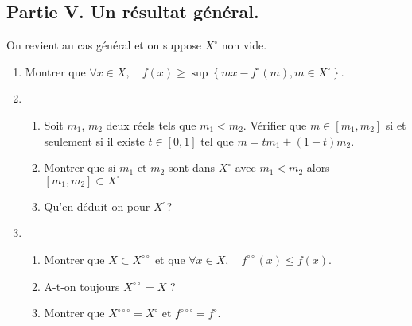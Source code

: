 \subsection*{Partie V. Un résultat général.}
On revient au cas g\'{e}n\'{e}ral et on suppose $X^{\circ }$ non vide.
\begin{enumerate}
\item Montrer que $\forall x\in X,\quad f(x)\geq \sup \left\{ mx-f^{\circ}(m),m\in X^{\circ }\right\} $.

\item
\begin{enumerate}
\item  Soit $m_{1}$, $m_{2}$ deux r\'{e}els tels que $m_{1}<m_{2}$.
V\'{e}rifier que $m\in \left[ m_{1},m_{2}\right] $ si et seulement si il
existe $t\in \left[ 0,1\right] $ tel que $m=tm_{1}+(1-t)m_{2}$.

\item  Montrer que si $m_{1}$ et $m_{2}$ sont dans $X^{\circ }$ avec $%
m_{1}<m_{2}$ alors $\left[ m_{1},m_{2}\right] \subset X^{\circ }$

\item  Qu'en d\'{e}duit-on pour $X^{\circ }$?
\end{enumerate}

\item \begin{enumerate}
\item  Montrer que $X\subset X^{\circ \circ }$ et que $\forall x\in X,\quad
f^{\circ \circ }(x)\leq f(x)$.

\item  A-t-on toujours $X^{\circ \circ }=X$ ?

\item  Montrer que $X^{\circ \circ \circ }=X^{\circ }$ et $f^{\circ \circ \circ
}=f^{\circ }$.
\end{enumerate}

\end{enumerate}
